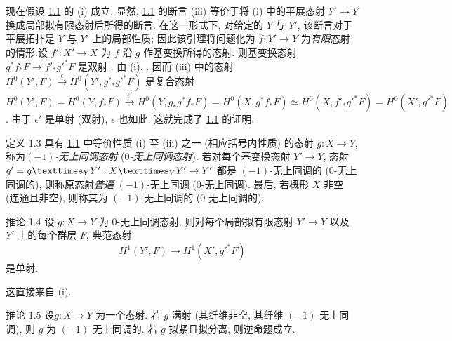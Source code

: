 现在假设 \hyperref[XV.prop1.1]{1.1} 的 (i) 成立. 显然, \hyperref[XV.prop1.1]{1.1} 的断言 (iii) 等价于将 (i) 中的平展态射 $Y'\rightarrow Y$ 换成局部拟有限态射后所得的断言. 在这一形式下, 对给定的 $Y$ 与 $Y'$, 该断言对于平展拓扑是 $Y$ 与 $Y'$ 上的局部性质; 因此该引理将问题化为 $f:Y'\rightarrow Y$ 为\emph{有限}态射的情形.\pageoriginale 设 $f':X'\rightarrow X$ 为 $f$ 沿 $g$ 作基变换所得的态射. 则基变换态射 $g^{\ast}f_{\ast}F\rightarrow {f'}_{\ast}{g'}^{\ast}F$ 是双射 . 由 (i),
.
因而 (iii) 中的态射 $H^{0}(Y',F)\xrightarrow{\epsilon}
H^{0}(Y',g'_{\ast}{g'}^{\ast}F)$ 是复合态射 $H^{0}(Y',F)=H^{0}(Y,f_{\ast}F)\xrightarrow{\epsilon'}
H^{0}(Y,g_{\ast}g^{\ast}f_{\ast}F)=H^{0}(X,g^{\ast}f_{\ast}F)\simeq
H^{0}(X,{f'}_{\ast}{g'}^{\ast}F)=H^{0}(X',{g'}^{\ast}F)$.
由于 $\epsilon'$ 是单射 (\resp 双射), $\epsilon$ 也如此. 这就完成了 \hyperref[XV.prop1.1]{1.1} 的证明.

\begin{enonce*}{定义 1.3}
具有 \hyperref[XV.prop1.1]{1.1} 中等价性质 {\rm(i)} 至 {\rm(iii)} 之一 (\resp 相应括号内性质) 的态射 $g:X\rightarrow Y$, 称为\emph{$(-1)$-无上同调态射} (\resp \emph{$0$-无上同调态射}). 若对每个基变换态射 $Y'\rightarrow Y$, 态射 $g'=\fprod{g}{Y'}{Y}:\fprod{X}{Y'}{Y}\rightarrow Y'$ 都是 $(-1)$-无上同调的 (\resp $0$-无上同调的), 则称原态射\emph{普遍} $(-1)$-无上同调 (\resp $0$-无上同调). 最后, 若概形 $X$ 非空 (\resp 连通且非空), 则称其为 $(-1)$-无上同调的 (\resp $0$-无上同调的).
\end{enonce*}

\begin{enonce*}{推论 1.4}
设 $g:X\rightarrow Y$ 为 $0$-无上同调态射. 则对每个局部拟有限态射 $Y'\rightarrow Y$ 以及 $Y'$ 上的每个群层 $F$, 典范态射
$$
H^{1}(Y',F)\longrightarrow H^{1}(X',{g'}^{\ast}F)
$$
是单射.
\end{enonce*}

这直接来自  (i).

\begin{enonce*}{推论 1.5}
设\pageoriginale $g:X\rightarrow Y$ 为一个态射. 若 $g$ 满射 (\ie 其纤维非空, \ie 其纤维 $(-1)$-无上同调), 则 $g$ 为 $(-1)$-无上同调的. 若 $g$ 拟紧且拟分离, 则逆命题成立.
\end{enonce*}

